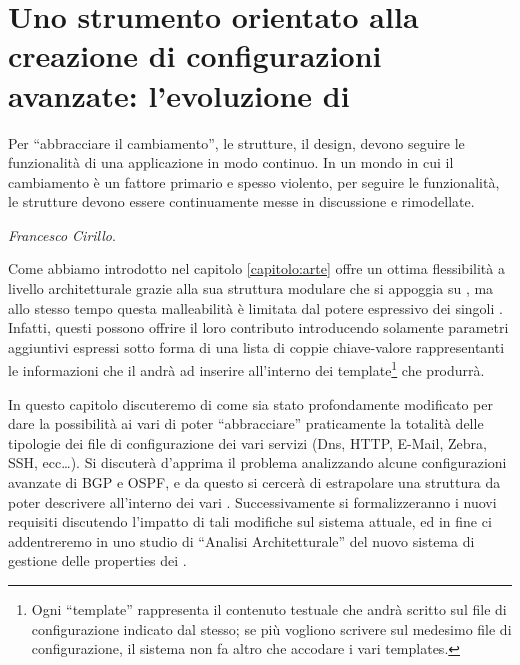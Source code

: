 \chapter{Uno strumento orientato alla creazione di configurazioni avanzate: l'evoluzione di \visualnetkit{}}\label{capitolo:evoluzione_visualnetkit}

\begin{flushright}
\begin{footnotesize}
Per ``abbracciare il cambiamento'', le strutture, il design, devono seguire le funzionalità di una applicazione in modo continuo. In un mondo in cui il cambiamento è un fattore primario e spesso violento, per seguire le funzionalità, le strutture devono essere continuamente messe in discussione e rimodellate.\\
\end{footnotesize}
\begin{footnotesize}
\textit{Francesco Cirillo}.
\end{footnotesize}
\end{flushright}

Come abbiamo introdotto nel capitolo \ref{capitolo:arte} \visualnetkit{} offre un ottima flessibilità a livello architetturale grazie alla sua struttura modulare che si appoggia su \plugin{}, ma allo stesso tempo questa malleabilità è limitata dal potere espressivo dei singoli \plugin{}. Infatti, questi possono offrire il loro contributo introducendo solamente parametri aggiuntivi espressi sotto forma di una lista di coppie chiave-valore rappresentanti le informazioni che il \plugin{} andrà ad inserire all'interno dei template\footnote{Ogni ``template'' rappresenta il contenuto testuale che andrà scritto sul file di configurazione indicato dal \plugin{} stesso; se più \plugin{} vogliono scrivere sul medesimo file di configurazione, il sistema non fa altro che accodare i vari templates.} che produrrà.

In questo capitolo discuteremo di come \visualnetkit{} sia stato profondamente modificato per dare la possibilità ai vari \plugin{} di poter ``abbracciare'' praticamente la totalità delle tipologie dei file di configurazione dei vari servizi (Dns, HTTP, E-Mail, Zebra, SSH, ecc\ldots). Si discuterà d'apprima il problema analizzando alcune configurazioni avanzate di BGP e OSPF, e da questo si cercerà di estrapolare una struttura da poter descrivere all'interno dei vari \plugin{}. Successivamente si formalizzeranno i nuovi requisiti discutendo l'impatto di tali modifiche sul sistema attuale, ed in fine ci addentreremo in uno studio di ``Analisi Architetturale'' del nuovo sistema di gestione delle properties dei \plugin{}.

